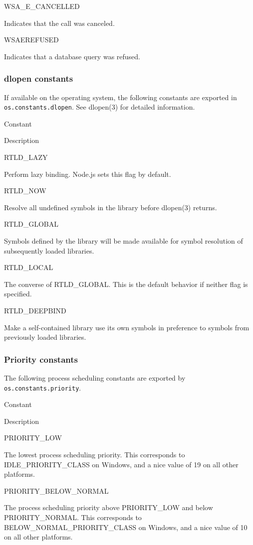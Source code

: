 WSA\_E\_CANCELLED

Indicates that the call was canceled.

WSAEREFUSED

Indicates that a database query was refused.

\subsubsection{dlopen constants}\label{dlopen-constants}

If available on the operating system, the following constants are
exported in \texttt{os.constants.dlopen}. See dlopen(3) for detailed
information.

Constant

Description

RTLD\_LAZY

Perform lazy binding. Node.js sets this flag by default.

RTLD\_NOW

Resolve all undefined symbols in the library before dlopen(3) returns.

RTLD\_GLOBAL

Symbols defined by the library will be made available for symbol
resolution of subsequently loaded libraries.

RTLD\_LOCAL

The converse of RTLD\_GLOBAL. This is the default behavior if neither
flag is specified.

RTLD\_DEEPBIND

Make a self-contained library use its own symbols in preference to
symbols from previously loaded libraries.

\subsubsection{Priority constants}\label{priority-constants}

The following process scheduling constants are exported by
\texttt{os.constants.priority}.

Constant

Description

PRIORITY\_LOW

The lowest process scheduling priority. This corresponds to
IDLE\_PRIORITY\_CLASS on Windows, and a nice value of 19 on all other
platforms.

PRIORITY\_BELOW\_NORMAL

The process scheduling priority above PRIORITY\_LOW and below
PRIORITY\_NORMAL. This corresponds to BELOW\_NORMAL\_PRIORITY\_CLASS on
Windows, and a nice value of 10 on all other platforms.

